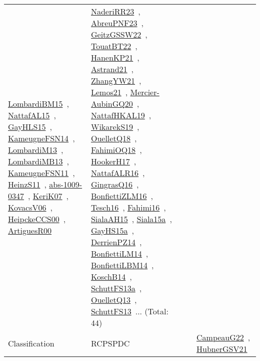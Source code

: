 {\begin{longtable}{lp{3cm}>{\raggedright\arraybackslash}p{6cm}>{\raggedright\arraybackslash}p{6cm}>{\raggedright\arraybackslash}p{8cm}}
\href{works/LombardiBM15.pdf}{LombardiBM15}~\cite{LombardiBM15}, \href{works/NattafAL15.pdf}{NattafAL15}~\cite{NattafAL15}, \href{works/GayHLS15.pdf}{GayHLS15}~\cite{GayHLS15}, \href{works/KameugneFSN14.pdf}{KameugneFSN14}~\cite{KameugneFSN14}, \href{works/LombardiM13.pdf}{LombardiM13}~\cite{LombardiM13}, \href{works/LombardiMB13.pdf}{LombardiMB13}~\cite{LombardiMB13}, \href{works/KameugneFSN11.pdf}{KameugneFSN11}~\cite{KameugneFSN11}, \href{works/HeinzS11.pdf}{HeinzS11}~\cite{HeinzS11}, \href{works/abs-1009-0347.pdf}{abs-1009-0347}~\cite{abs-1009-0347}, \href{works/KeriK07.pdf}{KeriK07}~\cite{KeriK07}, \href{works/KovacsV06.pdf}{KovacsV06}~\cite{KovacsV06}, \href{works/HeipckeCCS00.pdf}{HeipckeCCS00}~\cite{HeipckeCCS00}, \href{works/ArtiguesR00.pdf}{ArtiguesR00}~\cite{ArtiguesR00} & \href{works/NaderiRR23.pdf}{NaderiRR23}~\cite{NaderiRR23}, \href{works/AbreuPNF23.pdf}{AbreuPNF23}~\cite{AbreuPNF23}, \href{works/GeitzGSSW22.pdf}{GeitzGSSW22}~\cite{GeitzGSSW22}, \href{works/TouatBT22.pdf}{TouatBT22}~\cite{TouatBT22}, \href{works/HanenKP21.pdf}{HanenKP21}~\cite{HanenKP21}, \href{works/Astrand21.pdf}{Astrand21}~\cite{Astrand21}, \href{works/ZhangYW21.pdf}{ZhangYW21}~\cite{ZhangYW21}, \href{works/Lemos21.pdf}{Lemos21}~\cite{Lemos21}, \href{works/Mercier-AubinGQ20.pdf}{Mercier-AubinGQ20}~\cite{Mercier-AubinGQ20}, \href{works/NattafHKAL19.pdf}{NattafHKAL19}~\cite{NattafHKAL19}, \href{works/WikarekS19.pdf}{WikarekS19}~\cite{WikarekS19}, \href{works/OuelletQ18.pdf}{OuelletQ18}~\cite{OuelletQ18}, \href{works/FahimiOQ18.pdf}{FahimiOQ18}~\cite{FahimiOQ18}, \href{works/HookerH17.pdf}{HookerH17}~\cite{HookerH17}, \href{works/NattafALR16.pdf}{NattafALR16}~\cite{NattafALR16}, \href{works/GingrasQ16.pdf}{GingrasQ16}~\cite{GingrasQ16}, \href{works/BonfiettiZLM16.pdf}{BonfiettiZLM16}~\cite{BonfiettiZLM16}, \href{works/Tesch16.pdf}{Tesch16}~\cite{Tesch16}, \href{works/Fahimi16.pdf}{Fahimi16}~\cite{Fahimi16}, \href{works/SialaAH15.pdf}{SialaAH15}~\cite{SialaAH15}, \href{works/Siala15a.pdf}{Siala15a}~\cite{Siala15a}, \href{works/GayHS15a.pdf}{GayHS15a}~\cite{GayHS15a}, \href{works/DerrienPZ14.pdf}{DerrienPZ14}~\cite{DerrienPZ14}, \href{works/BonfiettiLM14.pdf}{BonfiettiLM14}~\cite{BonfiettiLM14}, \href{works/BonfiettiLBM14.pdf}{BonfiettiLBM14}~\cite{BonfiettiLBM14}, \href{works/KoschB14.pdf}{KoschB14}~\cite{KoschB14}, \href{works/SchuttFS13a.pdf}{SchuttFS13a}~\cite{SchuttFS13a}, \href{works/OuelletQ13.pdf}{OuelletQ13}~\cite{OuelletQ13}, \href{works/SchuttFS13.pdf}{SchuttFS13}~\cite{SchuttFS13}... (Total: 44)\\
Classification & RCPSPDC &  &  & \href{works/CampeauG22.pdf}{CampeauG22}~\cite{CampeauG22}, \href{works/HubnerGSV21.pdf}{HubnerGSV21}~\cite{HubnerGSV21}\\

\end{longtable}}

